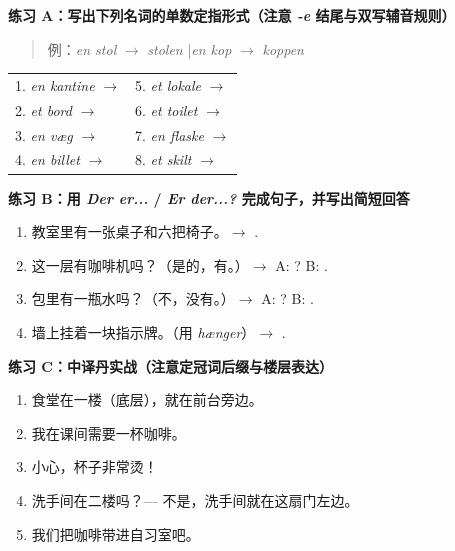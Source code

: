 \textbf{练习 A：写出下列名词的单数定指形式（注意 \textit{-e} 结尾与双写辅音规则）}
\begin{quote}
\small 例：\textit{en stol} $\rightarrow$ \textit{stolen} \quad|\quad \textit{en kop} $\rightarrow$ \textit{koppen}
\end{quote}
\begin{tabularx}{\linewidth}{@{} X X @{}}
1. \textit{en kantine} $\rightarrow$ \underline{\hspace{2.8cm}} & 5. \textit{et lokale} $\rightarrow$ \underline{\hspace{2.8cm}} \\
2. \textit{et bord} $\rightarrow$ \underline{\hspace{2.8cm}} & 6. \textit{et toilet} $\rightarrow$ \underline{\hspace{2.8cm}} \\
3. \textit{en væg} $\rightarrow$ \underline{\hspace{2.8cm}} & 7. \textit{en flaske} $\rightarrow$ \underline{\hspace{2.8cm}} \\
4. \textit{en billet} $\rightarrow$ \underline{\hspace{2.8cm}} & 8. \textit{et skilt} $\rightarrow$ \underline{\hspace{2.8cm}} \\
\end{tabularx}
\vspace{0.35em}

\textbf{练习 B：用 \textit{Der er...} / \textit{Er der...?} 完成句子，并写出简短回答}
\begin{enumerate}
  \item 教室里有一张桌子和六把椅子。$\rightarrow$ \underline{\hspace{6.5cm}}.
  \item 这一层有咖啡机吗？（是的，有。）$\rightarrow$ A: \underline{\hspace{4.5cm}}? \quad B: \underline{\hspace{3.0cm}}.
  \item 包里有一瓶水吗？（不，没有。）$\rightarrow$ A: \underline{\hspace{4.5cm}}? \quad B: \underline{\hspace{3.0cm}}.
  \item 墙上挂着一块指示牌。（用 \textit{hænger}）$\rightarrow$ \underline{\hspace{6.5cm}}.
\end{enumerate}

\textbf{练习 C：中译丹实战（注意定冠词后缀与楼层表达）}
\begin{enumerate}
  \item 食堂在一楼（底层），就在前台旁边。
  \item 我在课间需要一杯咖啡。
  \item 小心，杯子非常烫！
  \item 洗手间在二楼吗？--- 不是，洗手间就在这扇门左边。
  \item 我们把咖啡带进自习室吧。
\end{enumerate}

